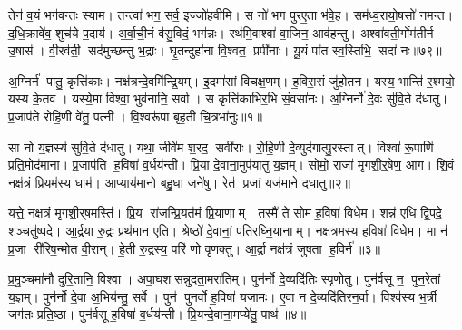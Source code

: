 तेन॑ व॒यं भग॑वन्तः स्याम।
तन्त्वा॑ भग॒ सर्व॒ इज्जो॑हवीमि।
स नो॑ भग पुरए॒ता भ॑वे॒ह।
सम॑ध्व॒रायो॒षसो॑ नमन्त।
द॒धि॒क्रावे॑व॒ शुच॑ये प॒दाय॑।
अ॒र्वा॒ची॒नं व॑सु॒विदं॒ भग॑न्नः।
रथ॑मि॒वाश्वा॑ वा॒जिन॒ आव॑हन्तु।
अश्वा॑वती॒र्गोम॑तीर्न उ॒षास॑।
वी॒रव॑ती॒ सद॑मुच्छन्तु भ॒द्राः।
घृ॒तन्दुहा॑ना वि॒श्वत॒ प्रपी॑नाः।
यू॒यं पा॑त स्व॒स्तिभि॒ सदा॑ नः॥७९॥\anuvakamend[वि॒च॒क्ष॒णा वि॑चर्तु॒र शर्म॒न्नधि॑ वि॒सर्ज॑नाय॒ ब्रह्म॒ वनं॒ ब्रह्म॒ स वृ॒क्ष आ॑सीत्तु॒रश्चि॑द्देवा॒ प्रपी॑ना॒ एकं च]
\clearpage

\setcounter{anuvakam}{0}

अ॒ग्निर्न॑ पातु॒ कृत्ति॑काः।
नक्ष॑त्रन्दे॒वमि॑न्द्रि॒यम्।
इ॒दमा॑सां विचक्ष॒णम्।
ह॒विरा॒सं जु॑होतन।
यस्य॒ भान्ति॑ र॒श्मयो॒ यस्य के॒तव॑।
यस्ये॒मा विश्वा॒ भुव॑नानि॒ सर्वा।
स कृत्ति॑काभिर॒भि सं॒वसा॑नः।
अ॒ग्निर्नो॑ दे॒वः सु॑वि॒ते द॑धातु।
प्र॒जाप॑ते रोहि॒णी वे॑तु॒ पत्नी।
वि॒श्वरू॑पा बृह॒ती चि॒त्रभा॑नुः॥१॥

सा नो॑ य॒ज्ञस्य॑ सुवि॒ते द॑धातु।
यथा॒ जीवे॑म श॒रद॒ सवी॑राः।
रो॒हि॒णी दे॒व्युद॑गात्पु॒रस्तात्।
विश्वा॑ रू॒पाणि॑ प्रति॒मोद॑माना।
प्र॒जाप॑ति ह॒विषा॑ व॒र्धय॑न्ती।
प्रि॒या दे॒वाना॒मुप॑यातु य॒ज्ञम्।
सोमो॒ राजा॑ मृगशी॒र्॒षेण॒ आग\sn{}।
शि॒वं नक्ष॑त्रं प्रि॒यम॑स्य॒ धाम॑।
आ॒प्याय॑मानो बहु॒धा जने॑षु।
रेत॑ प्र॒जां यज॑माने दधातु॥२॥

यत्ते॒ न॑क्षत्रं मृगशी॒र्‌षमस्ति॑।
प्रि॒य रा॑जन्प्रि॒यत॑मं प्रि॒याणाम्।
तस्मै॑ ते सोम ह॒विषा॑ विधेम।
शन्न॑ एधि द्वि॒पदे॒ शञ्चतु॑ष्पदे।
आ॒र्द्रया॑ रु॒द्रः प्रथ॑मान एति।
श्रेष्ठो॑ दे॒वानां॒ पति॑रघ्नि॒यानाम्।
नक्ष॑त्रमस्य ह॒विषा॑ विधेम।
मा न॑ प्र॒जा री॑रिष॒न्मोत वी॒रान्।
हे॒ती रु॒द्रस्य॒ परि॑ णो वृणक्तु।
आ॒र्द्रा नक्ष॑त्रं जुषता ह॒विर्न॑॥३॥

प्र॒मु॒ञ्चमा॑नौ दुरि॒तानि॒ विश्वा।
अपा॒घशसन्नुदता॒मरा॑तिम्।
पुन॑र्नो दे॒व्यदि॑तिः स्पृणोतु।
पुन॑र्वसू न॒ पुन॒रेतां य॒ज्ञम्।
पुन॑र्नो दे॒वा अ॒भिय॑न्तु॒ सर्वे।
पुन॑ पुनर्वो ह॒विषा॑ यजामः।
ए॒वा न दे॒व्यदि॑तिरन॒र्वा।
विश्व॑स्य भ॒र्त्री जग॑तः प्रति॒ष्ठा।
पुन॑र्वसू ह॒विषा॑ व॒र्धय॑न्ती।
प्रि॒यन्दे॒वाना॒मप्ये॑तु॒ पाथ॑॥४॥

